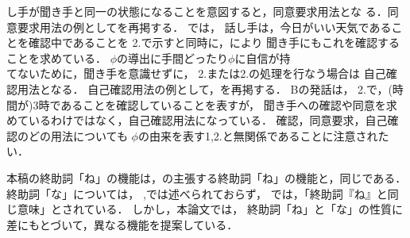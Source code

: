 し手が聞き手と同一の状態になることを意図すると，同意要求用法とな
る．同意要求用法の例としてを再掲する．
では，
話し手は，今日がいい天気であることを確認中であることを
2.で示すと同時に，により
聞き手にもこれを確認することを求めている．
\(\phi\)の導出に手間どったり\(\phi\)に自信が持\\てないために，聞き手を意識せずに，
2.または2.の処理を行なう場合は
自己確認用法となる．
自己確認用法の例として，を再掲する．
Bの発話は，
2.で，(時間が)3時であることを確認していることを表すが，
聞き手への確認や同意を求めているわけではなく，自己確認用法になっている．
確認，同意要求，自己確認のどの用法についても
\(\phi\)の由来を表す1,2.と無関係であることに注意されたい．


本稿の終助詞「ね」の機能は，\cite{kinsui93,kinsui93-3}の主張する終助詞「ね」の機能と，同じである．
終助詞「な」については，
\cite{kawamori91,kamio90},\cite{katagiri93}では述べられておらず，
\cite{kinsui93,kinsui93-3}では，「終助詞『ね』と同じ意味」とされている．
しかし，本論文では，
終助詞「ね」と「な」の性質に差にもとづいて，異なる機能を提案している．

